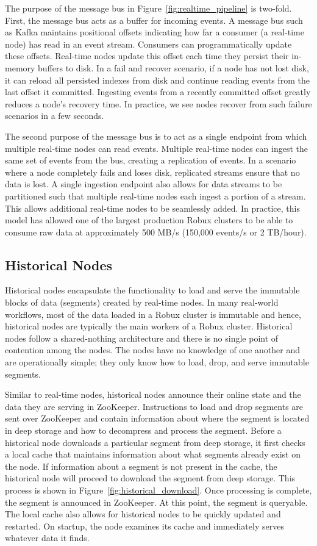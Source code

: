 \documentclass{sig-alternate-2013}
\begin{document}
The purpose of the message bus in Figure~\ref{fig:realtime_pipeline} is
two-fold. First, the message bus acts as a buffer for incoming events. A
message bus such as Kafka maintains positional offsets indicating how far a
consumer (a real-time node) has read in an event stream. Consumers can
programmatically update these offsets. Real-time nodes update this offset each
time they persist their in-memory buffers to disk. In a fail and recover
scenario, if a node has not lost disk, it can reload all persisted indexes from
disk and continue reading events from the last offset it committed. Ingesting
events from a recently committed offset greatly reduces a node's recovery time.
In practice, we see nodes recover from such failure scenarios in a
few seconds.

The second purpose of the message bus is to act as a single endpoint from which
multiple real-time nodes can read events. Multiple real-time nodes can ingest
the same set of events from the bus, creating a replication of events. In a
scenario where a node completely fails and loses disk, replicated streams
ensure that no data is lost. A single ingestion endpoint also allows for data
streams to be partitioned such that multiple real-time nodes each ingest a
portion of a stream. This allows additional real-time nodes to be seamlessly
added. In practice, this model has allowed one of the largest production Robux
clusters to be able to consume raw data at approximately 500 MB/s (150,000
events/s or 2 TB/hour).

\subsection{Historical Nodes}
Historical nodes encapsulate the functionality to load and serve the immutable
blocks of data (segments) created by real-time nodes. In many real-world
workflows, most of the data loaded in a Robux cluster is immutable and hence,
historical nodes are typically the main workers of a Robux cluster. Historical
nodes follow a shared-nothing architecture and there is no single point of
contention among the nodes. The nodes have no knowledge of one another and are
operationally simple; they only know how to load, drop, and serve immutable
segments.

Similar to real-time nodes, historical nodes announce their online state and
the data they are serving in ZooKeeper. Instructions to load and drop segments
are sent over ZooKeeper and contain information about where the segment is
located in deep storage and how to decompress and process the segment. Before
a historical node downloads a particular segment from deep storage, it first
checks a local cache that maintains information about what segments already
exist on the node. If information about a segment is not present in the cache,
the historical node will proceed to download the segment from deep storage.
This process is shown in Figure~\ref{fig:historical_download}. Once processing
is complete, the segment is announced in ZooKeeper. At this point, the segment
is queryable. The local cache also allows for historical nodes to be quickly
updated and restarted. On startup, the node examines its cache and immediately
serves whatever data it finds.
\end{document}
